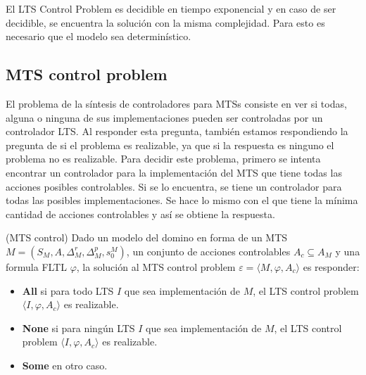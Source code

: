 El LTS Control Problem es decidible en tiempo exponencial y en caso de ser decidible, se encuentra la solución con la
misma complejidad. Para esto es necesario que el modelo sea determinístico.

\subsection{MTS	control problem}

El problema de la síntesis de controladores para MTSs \cite{MTSControl} consiste en ver si todas, alguna o ninguna de sus implementaciones
pueden ser controladas por un controlador LTS. Al responder esta pregunta, también estamos respondiendo la pregunta de
si el problema es realizable, ya que si la respuesta es ninguno el problema no es realizable. Para decidir este problema,
primero se intenta encontrar un controlador para la implementación del MTS que tiene todas las acciones posibles controlables.
Si se lo encuentra, se tiene un controlador para todas las posibles implementaciones. Se hace lo mismo con el que tiene la
mínima cantidad de acciones controlables y así se obtiene la respuesta.

\begin{definition}{(MTS control)}
Dado un modelo del domino en forma de un MTS $M = (S_{M}, A, \Delta_{M}^{r}, \Delta_{M}^{p}, s_{0}^{M})$, un conjunto de
acciones controlables $A_{c} \subseteq A_{M}$ y una formula FLTL $\varphi$, la solución al MTS control problem
$\varepsilon = \langle M, \varphi, A_{c} \rangle$ es responder:

\begin{itemize}

\item
\textbf{All} si para todo LTS $I$ que sea implementación de $M$, el LTS control problem $\langle I, \varphi, A_{c} \rangle$ es realizable.

\item
\textbf{None} si para ningún LTS $I$ que sea implementación de $M$, el LTS control problem $\langle I, \varphi, A_{c} \rangle$ es realizable.

\item
\textbf{Some} en otro caso.

\end{itemize}

\end{definition}